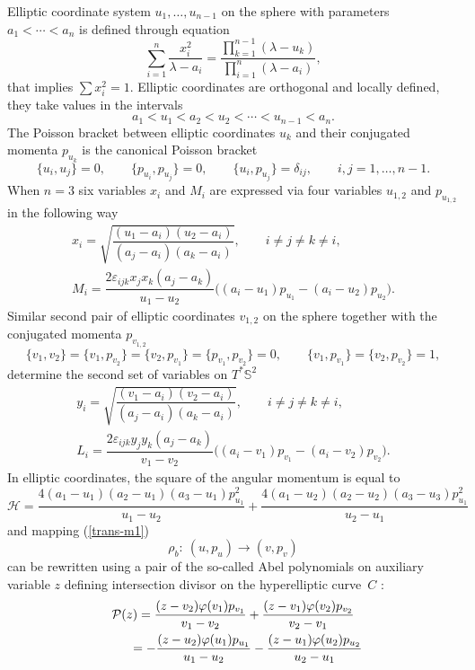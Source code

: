 \documentclass[pdftex]{sigma}
\numberwithin{equation}{section}
\begin{document}
Elliptic coordinate system $u_1,\dots, u_{n-1}$ on the sphere
 with parameters $a_1<\cdots<a_n$ is defined through equation
\begin{equation}\label{ell-sph}
\sum_{i=1}^{n}\frac{x_i^2}{\lambda-a_i}=\frac{\prod_{k=1}^{n-1}(\lambda-u_k)}{\prod_{i=1}^n(\lambda-a_i)} ,
\end{equation}
that implies $\sum x_i^2=1$. Elliptic coordinates are orthogonal and locally defined, they take values in the intervals
\[a_1<u_1<a_2<u_2<\cdots< u_{n-1}<a_n .\]
The Poisson bracket between elliptic coordinates $u_{k}$ and their conjugated momenta $p_{u_{k}}$ is the canonical Poisson bracket
\[
\{u_i,u_j\}= 0 ,\qquad \{p_{u_i},p_{u_j}\}=0 ,\qquad \{u_i,p_{u_j}\}=\delta_{ij}  ,\qquad i,j=1,\dots,n-1.
\]
When $n=3$ six variables $x_i$ and $M_i$ are expressed via four variables $u_{1,2}$ and $p_{u_{1,2}}$ in the following way
\begin{gather}
x_i=\sqrt{\dfrac{(u_1-a_i)(u_2-a_i)}{(a_j-a_i)(a_k-a_i)}}
,\qquad i\neq j\neq k\neq i ,\nonumber\\
\label{xm-ell}
M_i=\dfrac{2\varepsilon_{ijk}x_jx_k(a_j-a_k)}{u_1-u_2}
\bigl((a_i-u_1)p_{u_1}-(a_i-u_2)p_{u_2}\bigr) .
\end{gather}
Similar second pair of elliptic coordinates $v_{1,2}$ on the sphere together with the conjugated momenta $p_{v_{1,2}}$
\[
\{v_1,v_2\}=\{v_1,p_{v_2}\}=\{v_2,p_{v_1}\}=\{p_{v_1},p_{v_2}\}=0 ,\qquad \{v_1,p_{v_1}\}=\{v_2,p_{v_2}\}=1 ,
\]
determine the second set of variables on $T^*\mathbb S^2$
\begin{gather*}
y_i=\sqrt{\dfrac{(v_1-a_i)(v_2-a_i)}{(a_j-a_i)(a_k-a_i)}},\qquad i\neq j\neq k\neq i ,\\
L_i=\dfrac{2\varepsilon_{ijk}y_jy_k(a_j-a_k)}{v_1-v_2}
\bigl((a_i-v_1)p_{v_1}-(a_i-v_2)p_{v_2}\bigr) .
\end{gather*}
In elliptic coordinates, the square of the angular momentum is equal to
\begin{equation}\label{eul-ham1}
\mathcal H=\frac{4(a_1-u_1)(a_2-u_1)(a_3 - u_1)p_{u_1}^2}{u_1-u_2}+\frac{ 4(a_1 - u_2)(a_2 - u_2)(a_3 - u_3)p_{u_1}^2}{u_2 - u_1}
\end{equation}
and mapping (\ref{trans-m1})
 \[\rho_{b}\colon \ (u,p_u)\to(v,p_v)\]
 can be rewritten using a pair of the so-called Abel polynomials on auxiliary variable $z$ defining intersection divisor on the hyperelliptic curve~$C$ \cite{ts17v,ts17c}:
\begin{gather}
\mathcal P(z)=\frac{(z - v_2)\varphi(v_1)p_{v_1}}{v_1 -v_2} + \frac{(z-v_1)\varphi(v_2)p_{v_2}}{v_2-v_1}\nonumber\\
\hphantom{\mathcal P(z)}{} =-
\frac{(z - u_2)\varphi(u_1)p_{u_1}}{u_1 - u_2} - \frac{(z-u_1)\varphi(u_2)p_{u_2}}{u_2-u_1}\label{pz}
\end{gather}
\end{document}
